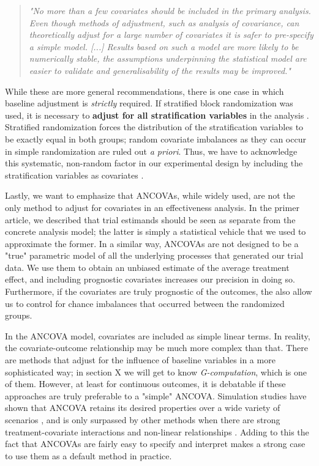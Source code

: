 \begin{quote}
    \emph{"No more than a few covariates should be included in the primary analysis. Even though methods of adjustment, such as analysis of covariance, can theoretically adjust for a large number of covariates it is safer to pre-specify a simple model. [...] Results based on such a model are more likely to be numerically stable, the assumptions underpinning the statistical model are easier to validate and generalisability of the results may be improved."}
\end{quote}

While these are more general recommendations, there is one case in which baseline adjustment is \emph{strictly} required. If stratified block randomization was used, it is necessary to \textbf{adjust for all stratification variables} in the analysis \citep{kahan2012reporting}. Stratified randomization forces the distribution of the stratification variables to be exactly equal in both groups; random covariate imbalances as they can occur in simple randomization are ruled out \emph{a priori}. Thus, we have to acknowledge this systematic, non-random factor in our experimental design by including the stratification variables as covariates \citep{kahan2012reporting}.

Lastly, we want to emphasize that ANCOVAs, while widely used, are not the only method to adjust for covariates in an effectiveness analysis. In the primer article, we described that trial estimands should be seen as separate from the concrete analysis model; the latter is simply a statistical vehicle that we used to approximate the former. In a similar way, ANCOVAs are not designed to be a "true" parametric model of all the underlying processes that generated our trial data. We use them to obtain an unbiased estimate of the average treatment effect, and including prognostic covariates increases our precision in doing so. Furthermore, if the covariates are truly prognostic of the outcomes, the also allow us to control for chance imbalances that occurred between the randomized groups.

In the ANCOVA model, covariates are included as simple linear terms. In reality, the covariate-outcome relationship may be much more complex than that. There are methods that adjust for the influence of baseline variables in a more sophisticated way; in section X we will get to know \emph{G-computation}, which is one of them. However, at least for continuous outcomes, it is debatable if these approaches are truly preferable to a "simple" ANCOVA. Simulation studies have shown that ANCOVA retains its desired properties over a wide variety of scenarios \citep{wang2019analysis, egbewale2014bias}, and is only surpassed by other methods when there are strong treatment-covariate interactions and non-linear relationships \citep{tackney2023comparison}. Adding to this the fact that ANCOVAs are fairly easy to specify and interpret makes a strong case to use them as a default method in practice. 

